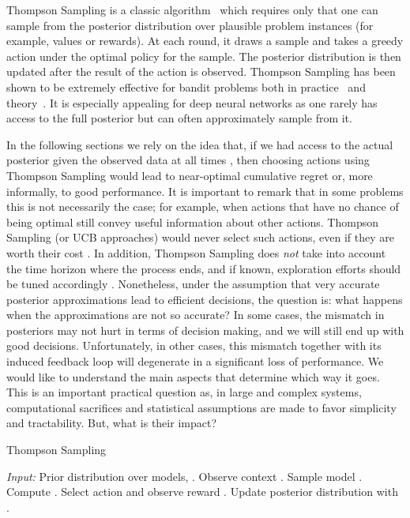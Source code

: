 \documentclass{article} \usepackage{iclr2018_conference,times}
\begin{document}
Thompson Sampling is a classic algorithm~\citep{thompson1933likelihood} which requires only that one can sample from the posterior distribution over plausible problem instances (for example, values or rewards).  At each round, it draws a sample and takes a greedy action under the optimal policy for the sample.  The posterior distribution is then updated after the result of the action is observed.  Thompson Sampling has been shown to be extremely effective for bandit problems both in practice~\citep{chappelle2011, granmo2010} and theory~\citep{agrawal2012}.  It is especially appealing for deep neural networks as one rarely has access to the full posterior but can often approximately sample from it. 

In the following sections we rely on the idea that, if we had access to the actual posterior  given the observed data at all times , then choosing actions using Thompson Sampling would lead to near-optimal cumulative regret or, more informally, to good performance.
It is important to remark that in some problems this is not necessarily the case; for example, when actions that have no chance of being optimal still convey useful information about other actions.
Thompson Sampling (or UCB approaches) would never select such actions, even if they are worth their cost \citep{russo2014learning}.
In addition, Thompson Sampling does \emph{not} take into account the time horizon where the process ends, and if known, exploration efforts should be tuned accordingly \citep{russo2017time}.
Nonetheless, under the assumption that very accurate posterior approximations lead to efficient decisions, the question is: what happens when the approximations are not so accurate?
In some cases, the mismatch in posteriors may not hurt in terms of decision making, and we will still end up with good decisions.
Unfortunately, in other cases, this mismatch together with its induced feedback loop will degenerate in a significant loss of performance.
We would like to understand the main aspects that determine which way it goes.
This is an important practical question as, in large and complex systems, computational sacrifices and statistical assumptions are made to favor simplicity and tractability. But, what is their impact?
\begin{algorithm}[t]
\caption{Thompson Sampling}\label{algo:ts}
\begin{algorithmic}[1]
\State \emph{Input:} Prior distribution over models, .
\State Observe context .
\State Sample model .
\State Compute .
\State Select action  and observe reward .
\State Update posterior distribution  with .
\EndFor
\end{algorithmic}
\end{algorithm}
\end{document}

